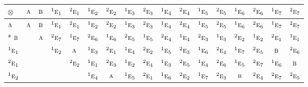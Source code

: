 \documentclass[10pt,a4paper]{article}
\numberwithin{equation}{section}
\newcommand{\irr}[1]{\text{\normalfont\scshape #1}}
\newcommand{\conjpair}[1]{{}^{#1}}
\newcommand{\irrprod}{\otimes}
\begin{document}
{\small\setlength{\tabcolsep}{3pt}\begin{longtable}{@{}lcccccccccccccccc@{}}\toprule
$\irrprod$ & $\irr{a}$ & $\irr{b}$ & $\conjpair{1}\irr{e}_{1}$ & $\conjpair{2}\irr{e}_{1}$ & $\conjpair{1}\irr{e}_{2}$ & $\conjpair{2}\irr{e}_{2}$ & $\conjpair{1}\irr{e}_{3}$ & $\conjpair{2}\irr{e}_{3}$ & $\conjpair{1}\irr{e}_{4}$ & $\conjpair{2}\irr{e}_{4}$ & $\conjpair{1}\irr{e}_{5}$ & $\conjpair{2}\irr{e}_{5}$ & $\conjpair{1}\irr{e}_{6}$ & $\conjpair{2}\irr{e}_{6}$ & $\conjpair{1}\irr{e}_{7}$ & $\conjpair{2}\irr{e}_{7}$\\\midrule\endhead
\bottomrule\endfoot\endlastfoot
$\irr{a}$ & $\irr{a}$ & $\irr{b}$ & $\conjpair{1}\irr{e}_{1}$ & $\conjpair{2}\irr{e}_{1}$ & $\conjpair{1}\irr{e}_{2}$ & $\conjpair{2}\irr{e}_{2}$ & $\conjpair{1}\irr{e}_{3}$ & $\conjpair{2}\irr{e}_{3}$ & $\conjpair{1}\irr{e}_{4}$ & $\conjpair{2}\irr{e}_{4}$ & $\conjpair{1}\irr{e}_{5}$ & $\conjpair{2}\irr{e}_{5}$ & $\conjpair{1}\irr{e}_{6}$ & $\conjpair{2}\irr{e}_{6}$ & $\conjpair{1}\irr{e}_{7}$ & $\conjpair{2}\irr{e}_{7}$\\*
$\irr{b}$ &  & $\irr{a}$ & $\conjpair{2}\irr{e}_{7}$ & $\conjpair{1}\irr{e}_{7}$ & $\conjpair{2}\irr{e}_{6}$ & $\conjpair{1}\irr{e}_{6}$ & $\conjpair{2}\irr{e}_{5}$ & $\conjpair{1}\irr{e}_{5}$ & $\conjpair{2}\irr{e}_{4}$ & $\conjpair{1}\irr{e}_{4}$ & $\conjpair{2}\irr{e}_{3}$ & $\conjpair{1}\irr{e}_{3}$ & $\conjpair{2}\irr{e}_{2}$ & $\conjpair{1}\irr{e}_{2}$ & $\conjpair{2}\irr{e}_{1}$ & $\conjpair{1}\irr{e}_{1}$\\
$\conjpair{1}\irr{e}_{1}$ &  &  & $\conjpair{1}\irr{e}_{2}$ & $\irr{a}$ & $\conjpair{1}\irr{e}_{3}$ & $\conjpair{2}\irr{e}_{1}$ & $\conjpair{1}\irr{e}_{4}$ & $\conjpair{2}\irr{e}_{2}$ & $\conjpair{1}\irr{e}_{5}$ & $\conjpair{2}\irr{e}_{3}$ & $\conjpair{1}\irr{e}_{6}$ & $\conjpair{2}\irr{e}_{4}$ & $\conjpair{1}\irr{e}_{7}$ & $\conjpair{2}\irr{e}_{5}$ & $\irr{b}$ & $\conjpair{2}\irr{e}_{6}$\\
$\conjpair{2}\irr{e}_{1}$ &  &  &  & $\conjpair{2}\irr{e}_{2}$ & $\conjpair{1}\irr{e}_{1}$ & $\conjpair{2}\irr{e}_{3}$ & $\conjpair{1}\irr{e}_{2}$ & $\conjpair{2}\irr{e}_{4}$ & $\conjpair{1}\irr{e}_{3}$ & $\conjpair{2}\irr{e}_{5}$ & $\conjpair{1}\irr{e}_{4}$ & $\conjpair{2}\irr{e}_{6}$ & $\conjpair{1}\irr{e}_{5}$ & $\conjpair{2}\irr{e}_{7}$ & $\conjpair{1}\irr{e}_{6}$ & $\irr{b}$\\
$\conjpair{1}\irr{e}_{2}$ &  &  &  &  & $\conjpair{1}\irr{e}_{4}$ & $\irr{a}$ & $\conjpair{1}\irr{e}_{5}$ & $\conjpair{2}\irr{e}_{1}$ & $\conjpair{1}\irr{e}_{6}$ & $\conjpair{2}\irr{e}_{2}$ & $\conjpair{1}\irr{e}_{7}$ & $\conjpair{2}\irr{e}_{3}$ & $\irr{b}$ & $\conjpair{2}\irr{e}_{4}$ & $\conjpair{2}\irr{e}_{7}$ & $\conjpair{2}\irr{e}_{5}$\\

\end{longtable}}
\end{document}
